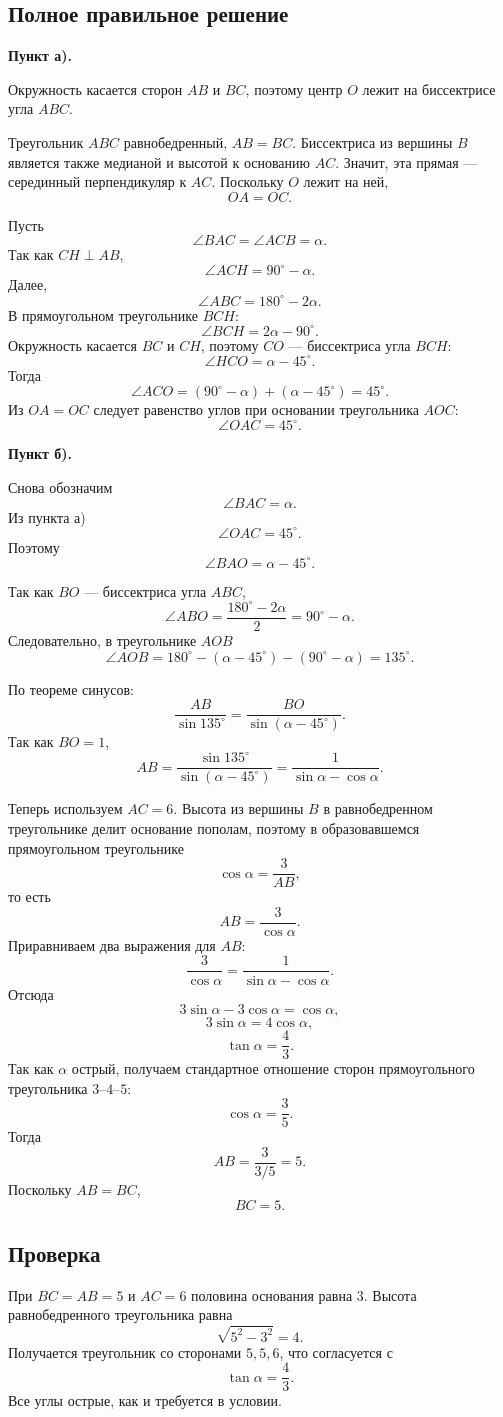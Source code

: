\documentclass[12pt,a4paper]{article}
\begin{document}
\subsection*{Полное правильное решение}
\textbf{Пункт а).}

Окружность касается сторон $AB$ и $BC$, поэтому центр $O$ лежит на биссектрисе угла $ABC$.

Треугольник $ABC$ равнобедренный, $AB=BC$. Биссектриса из вершины $B$ является также медианой и высотой к основанию $AC$. Значит, эта прямая --- серединный перпендикуляр к $AC$. Поскольку $O$ лежит на ней,
\[
OA=OC.
\]

Пусть
\[
\angle BAC=\angle ACB=\alpha.
\]
Так как $CH\perp AB$,
\[
\angle ACH=90^\circ-\alpha.
\]
Далее,
\[
\angle ABC=180^\circ-2\alpha.
\]
В прямоугольном треугольнике $BCH$:
\[
\angle BCH=2\alpha-90^\circ.
\]
Окружность касается $BC$ и $CH$, поэтому $CO$ --- биссектриса угла $BCH$:
\[
\angle HCO=\alpha-45^\circ.
\]
Тогда
\[
\angle ACO
=
(90^\circ-\alpha)+(\alpha-45^\circ)
=
45^\circ.
\]
Из $OA=OC$ следует равенство углов при основании треугольника $AOC$:
\[
\boxed{\angle OAC=45^\circ}.
\]

\textbf{Пункт б).}

Снова обозначим
\[
\angle BAC=\alpha.
\]
Из пункта а)
\[
\angle OAC=45^\circ.
\]
Поэтому
\[
\angle BAO=\alpha-45^\circ.
\]

Так как $BO$ --- биссектриса угла $ABC$,
\[
\angle ABO
=
\frac{180^\circ-2\alpha}{2}
=
90^\circ-\alpha.
\]
Следовательно, в треугольнике $AOB$
\[
\angle AOB
=
180^\circ-(\alpha-45^\circ)-(90^\circ-\alpha)
=
135^\circ.
\]

По теореме синусов:
\[
\frac{AB}{\sin135^\circ}
=
\frac{BO}{\sin(\alpha-45^\circ)}.
\]
Так как $BO=1$,
\[
AB=
\frac{\sin135^\circ}{\sin(\alpha-45^\circ)}
=
\frac{1}{\sin\alpha-\cos\alpha}.
\]

Теперь используем $AC=6$. Высота из вершины $B$ в равнобедренном треугольнике делит основание пополам, поэтому в образовавшемся прямоугольном треугольнике
\[
\cos\alpha=\frac{3}{AB},
\]
то есть
\[
AB=\frac{3}{\cos\alpha}.
\]
Приравниваем два выражения для $AB$:
\[
\frac{3}{\cos\alpha}
=
\frac{1}{\sin\alpha-\cos\alpha}.
\]
Отсюда
\[
3\sin\alpha-3\cos\alpha=\cos\alpha,
\]
\[
3\sin\alpha=4\cos\alpha,
\]
\[
\tan\alpha=\frac43.
\]
Так как $\alpha$ острый, получаем стандартное отношение сторон прямоугольного треугольника $3$--$4$--$5$:
\[
\cos\alpha=\frac35.
\]
Тогда
\[
AB=\frac{3}{3/5}=5.
\]
Поскольку $AB=BC$,
\[
\boxed{BC=5}.
\]

\subsection*{Проверка}
При $BC=AB=5$ и $AC=6$ половина основания равна $3$. Высота равнобедренного треугольника равна
\[
\sqrt{5^2-3^2}=4.
\]
Получается треугольник со сторонами $5,5,6$, что согласуется с
\[
\tan\alpha=\frac43.
\]
Все углы острые, как и требуется в условии.
\end{document}
